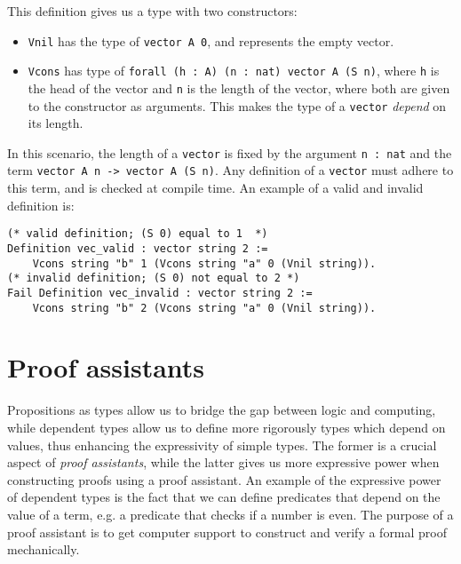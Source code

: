 This definition gives us a type with two constructors:

\begin{itemize}
    \item
        \lstinline{Vnil} has the type of \lstinline{vector A 0}, and represents the empty vector.
    \item
        \lstinline{Vcons} has type of \lstinline{forall (h : A) (n : nat) vector A (S n)}, where \lstinline{h}
                            is the head of the vector and \lstinline{n} is the length of the vector,
                            where both are given to the constructor as arguments.
                            This makes the type of a \lstinline{vector} \emph{depend} on its length.
\end{itemize}

In this scenario, the length of a \lstinline{vector} is fixed by the argument \lstinline{n : nat}
and the term \lstinline{vector A n -> vector A (S n)}.
Any definition of a \lstinline{vector} must adhere to this term, and is checked at compile time.
An example of a valid and invalid definition is:

\begin{minipage}{\linewidth}
\begin{lstlisting}[language=Coq, label={lst:dep_type_vec_ex}, caption={Examples of vectors in Coq}]
(* valid definition; (S 0) equal to 1  *)
Definition vec_valid : vector string 2 :=
    Vcons string "b" 1 (Vcons string "a" 0 (Vnil string)).
(* invalid definition; (S 0) not equal to 2 *)
Fail Definition vec_invalid : vector string 2 :=
    Vcons string "b" 2 (Vcons string "a" 0 (Vnil string)).
\end{lstlisting}
\end{minipage}

\section{Proof assistants}
\label{sec:proof_assistants}

Propositions as types allow us to bridge the gap between logic and computing,
while dependent types allow us to define more rigorously types which depend on values,
thus enhancing the expressivity of simple types.
The former is a crucial aspect of \emph{proof assistants}, while the latter gives
us more expressive power when constructing proofs using a proof assistant.
An example of the expressive power of dependent types is the fact that we can define
predicates that depend on the value of a term, e.g. a predicate that checks if a number is even.
The purpose of a proof assistant is to get computer support to construct and verify a formal proof mechanically.

